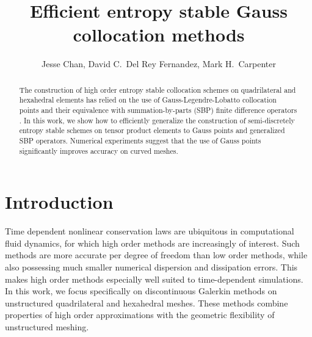 \documentclass[onefignum,onetabnum,final]{siamart171218}
\author{Jesse Chan, David C.\ Del Rey Fernandez, Mark H.\ Carpenter}
\title{Efficient entropy stable Gauss collocation methods}
\begin{document}
\maketitle

\begin{abstract}
The construction of high order entropy stable collocation schemes on quadrilateral and hexahedral elements has relied on the use of Gauss-Legendre-Lobatto collocation points \cite{fisher2013high, carpenter2014entropy, gassner2016split} and their equivalence with summation-by-parts (SBP) finite difference operators \cite{gassner2013skew}.  In this work, we show how to efficiently generalize the construction of semi-discretely entropy stable schemes on tensor product elements to Gauss points and generalized SBP operators.  Numerical experiments suggest that the use of Gauss points significantly improves accuracy on curved meshes.  
\end{abstract}

\section{Introduction}

Time dependent nonlinear conservation laws are ubiquitous in computational fluid dynamics, for which high order methods are increasingly of interest.  Such methods are more accurate per degree of freedom than low order methods, while also possessing much smaller numerical dispersion and dissipation errors.  This makes high order methods especially well suited to time-dependent simulations.  In this work, we focus specifically on discontinuous Galerkin methods on unstructured quadrilateral and hexahedral meshes.  These methods combine properties of high order approximations with the geometric flexibility of unstructured meshing.  %
\end{document}
